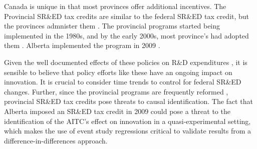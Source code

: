 \documentclass[../main.tex]{subfiles}
\begin{document}
Canada is unique in that most provinces offer additional incentives. The Provincial SR\&ED tax credits are similar to the federal SR\&ED tax credit, but the provinces admnister them \parencite{warda00}. The provincial programs started being implemented in the 1980s, and by the early 2000s, most province's had adopted them \parencite{warda98,mckenzie05}. Alberta implemented the program in 2009 \parencite{brouillete13}.

Given the well documented effects of these policies on R\&D expenditures \parencite{mansfield_switzer85b, agrawal_etal20, becker15}, it is sensible to believe that policy efforts like these have an ongoing impact on innovation. It is crucial to consider time trends to control for federal SR\&ED changes. Further, since the provincial programs are frequently reformed \parencite{mckenzie05}, provincial SR\&ED tax credits pose threats to causal identification. The fact that Alberta imposed an SR\&ED tax credit in 2009 could pose a threat to the identification of the AITC's effect on innovation in a quasi-experimental setting, which makes the use of event study regressions critical to validate results from a difference-in-differences approach.
\end{document}
